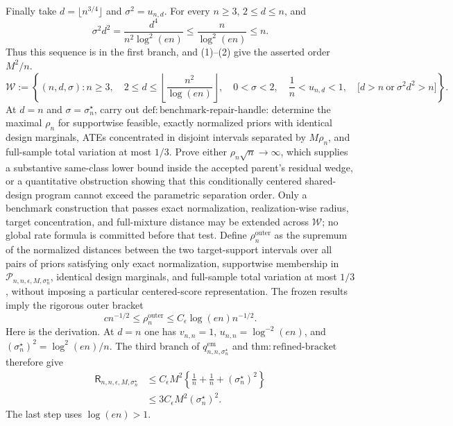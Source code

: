 Finally take \(d=\lfloor n^{3/4}\rfloor\) and \(\sigma^2=u_{n,d}\).  For every \(n\ge3\), \(2\le d\le n\), and
\[
 \sigma^2d^2
 =\frac{d^4}{n^2\log^2(en)}
 \le\frac{n}{\log^2(en)}
 \le n.                                                               \tag{5}
\]
Thus this sequence is in the first branch, and (1)--(2) give the asserted order \(M^2/n\).
\[
 \mathcal W:=\left\{(n,d,\sigma):
 n\ge3,\quad
 2\le d\le\left\lfloor\frac{n^2}{\log(en)}\right\rfloor,\quad
 0<\sigma<2,\quad
 \frac1n<u_{n,d}<1,\quad
 \bigl[d>n\ \text{or}\ \sigma^2d^2>n\bigr]
 \right\}.
\]
At \(d=n\) and \(\sigma=\sigma_n^\star\), carry out \(\mathrm{def:benchmark\text{-}repair\text{-}handle}\): determine the maximal \(\rho_n\) for supportwise feasible, exactly normalized priors with identical design marginals, ATEs concentrated in disjoint intervals separated by \(M\rho_n\), and full-sample total variation at most \(1/3\). Prove either \(\rho_n\sqrt n\to\infty\), which supplies a substantive same-class lower bound inside the accepted parent's residual wedge, or a quantitative obstruction showing that this conditionally centered shared-design program cannot exceed the parametric separation order. Only a benchmark construction that passes exact normalization, realization-wise radius, target concentration, and full-mixture distance may be extended across \(\mathcal W\); no global rate formula is committed before that test.
Define \(\rho_n^{\mathrm{outer}}\) as the supremum of the normalized distances between the two target-support intervals over all pairs of priors satisfying only exact normalization, supportwise membership in \(\mathcal P_{n,n,\epsilon,M,\sigma_n^\star}\), identical design marginals, and full-sample total variation at most \(1/3\), without imposing a particular centered-score representation.  The frozen results imply the rigorous outer bracket
\[
 c n^{-1/2}\le \rho_n^{\mathrm{outer}}
 \le C_{\epsilon}\log(en)n^{-1/2}.                                   \tag{6}
\]
Here is the derivation.  At \(d=n\) one has \(v_{n,n}=1\), \(u_{n,n}=\log^{-2}(en)\), and \((\sigma_n^\star)^2=\log^2(en)/n\).  The third branch of \(q_{n,n,\sigma_n^\star}^{\mathrm{em}}\) and \(\mathrm{thm:refined\text{-}bracket}\) therefore give
\[
 \begin{aligned}
 \mathsf R_{n,n,\epsilon,M,\sigma_n^\star}
 &\le C_{\epsilon}M^2\left\{\frac1n+\frac1n+
 (\sigma_n^\star)^2\right\}\\
 &\le 3C_{\epsilon}M^2(\sigma_n^\star)^2.                            \tag{7}
 \end{aligned}
\]
The last step uses \(\log(en)>1\).

